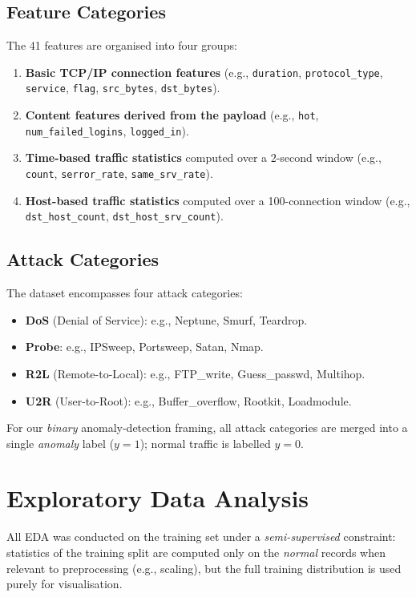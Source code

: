 \documentclass[conference]{IEEEtran}
\begin{document}
\subsection{Feature Categories}
The 41 features are organised into four groups:
\begin{enumerate}
  \item \textbf{Basic TCP/IP connection features} (e.g., \texttt{duration},
        \texttt{protocol\_type}, \texttt{service}, \texttt{flag},
        \texttt{src\_bytes}, \texttt{dst\_bytes}).
  \item \textbf{Content features derived from the payload} (e.g.,
        \texttt{hot}, \texttt{num\_failed\_logins}, \texttt{logged\_in}).
  \item \textbf{Time-based traffic statistics} computed over a 2-second window
        (e.g., \texttt{count}, \texttt{serror\_rate}, \texttt{same\_srv\_rate}).
  \item \textbf{Host-based traffic statistics} computed over a 100-connection window
        (e.g., \texttt{dst\_host\_count}, \texttt{dst\_host\_srv\_count}).
\end{enumerate}

\subsection{Attack Categories}
The dataset encompasses four attack categories:
\begin{itemize}
  \item \textbf{DoS} (Denial of Service): e.g., Neptune, Smurf, Teardrop.
  \item \textbf{Probe}: e.g., IPSweep, Portsweep, Satan, Nmap.
  \item \textbf{R2L} (Remote-to-Local): e.g., FTP\_write, Guess\_passwd, Multihop.
  \item \textbf{U2R} (User-to-Root): e.g., Buffer\_overflow, Rootkit, Loadmodule.
\end{itemize}

For our \emph{binary} anomaly-detection framing, all attack categories are merged
into a single \emph{anomaly} label ($y=1$); normal traffic is labelled $y=0$.

\section{Exploratory Data Analysis}
\label{sec:eda}

All EDA was conducted on the training set under a \textit{semi-supervised} constraint:
statistics of the training split are computed only on the \emph{normal} records when
relevant to preprocessing (e.g., scaling), but the full training distribution is used
purely for visualisation.
\end{document}
